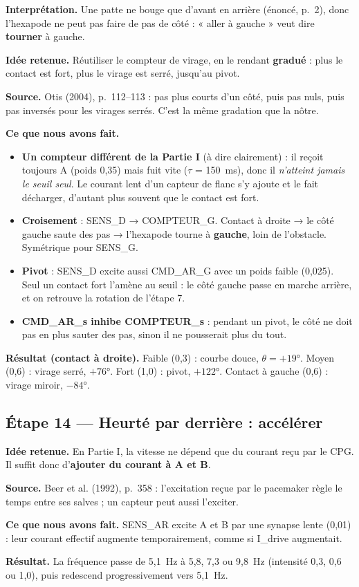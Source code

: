 \documentclass[11pt]{article}
\newcommand{\champ}[2]{\par\noindent\textbf{\color{bleu}#1} #2\par}
\begin{document}
\champ{Interprétation.}{Une patte ne bouge que d'avant en arrière (énoncé, p.~2), donc l'hexapode ne
peut pas faire de pas de côté : « aller à gauche » veut dire \textbf{tourner} à gauche.}
\champ{Idée retenue.}{Réutiliser le compteur de virage, en le rendant \textbf{gradué} : plus le
contact est fort, plus le virage est serré, jusqu'au pivot.}
\champ{Source.}{Otis (2004), p.~112--113 \cite{otis2004} : pas plus courts d'un côté, puis pas nuls,
puis pas inversés pour les virages serrés. C'est la même gradation que la nôtre.}
\champ{Ce que nous avons fait.}{}
\begin{itemize}
  \item \textbf{Un compteur différent de la Partie I} (à dire clairement) : il reçoit toujours A
        (poids 0,35) mais fuit vite ($\tau$ = 150~ms), donc il \emph{n'atteint jamais le seuil
        seul}. Le courant lent d'un capteur de flanc s'y ajoute et le fait décharger, d'autant plus
        souvent que le contact est fort.
  \item \textbf{Croisement} : SENS\_D → COMPTEUR\_G. Contact à droite → le côté gauche saute des
        pas → l'hexapode tourne à \textbf{gauche}, loin de l'obstacle. Symétrique pour SENS\_G.
  \item \textbf{Pivot} : SENS\_D excite aussi CMD\_AR\_G avec un poids faible (0,025). Seul un
        contact fort l'amène au seuil : le côté gauche passe en marche arrière, et on retrouve la
        rotation de l'étape 7.
  \item \textbf{CMD\_AR\_s inhibe COMPTEUR\_s} : pendant un pivot, le côté ne doit pas en plus
        sauter des pas, sinon il ne pousserait plus du tout.
\end{itemize}
\champ{Résultat (contact à droite).}{Faible (0,3) : courbe douce, $\theta = +19°$. Moyen (0,6) :
virage serré, $+76°$. Fort (1,0) : pivot, $+122°$. Contact à gauche (0,6) : virage miroir,
$-84°$.}

\subsection*{Étape 14 --- Heurté par derrière : accélérer}

\champ{Idée retenue.}{En Partie I, la vitesse ne dépend que du courant reçu par le CPG. Il suffit
donc d'\textbf{ajouter du courant à A et B}.}
\champ{Source.}{Beer et al. (1992), p.~358 \cite{beer1992} : l'excitation reçue par le pacemaker
règle le temps entre ses salves ; un capteur peut aussi l'exciter.}
\champ{Ce que nous avons fait.}{SENS\_AR excite A et B par une synapse lente (0,01) : leur
courant effectif augmente temporairement, comme si I\_drive augmentait.}
\champ{Résultat.}{La fréquence passe de 5,1~Hz à 5,8, 7,3 ou 9,8~Hz (intensité 0,3, 0,6 ou 1,0),
puis redescend progressivement vers 5,1~Hz.}
\end{document}
